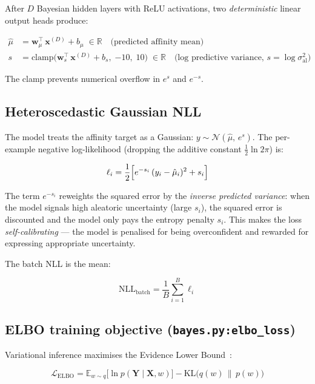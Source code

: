 \documentclass[11pt,a4paper]{article}
\newcommand{\R}{\mathbb{R}}
\newcommand{\code}[1]{\texttt{#1}}
\begin{document}
After $D$ Bayesian hidden layers with ReLU activations, two \emph{deterministic}
linear output heads produce:

\begin{align}
\hat{\mu} &= \mathbf{w}_\mu^\top\,\mathbf{x}^{(D)} + b_\mu \;\in \R
  \quad\text{(predicted affinity mean)}\\
s &= \mathrm{clamp}\!\bigl(
      \mathbf{w}_s^\top\,\mathbf{x}^{(D)} + b_s,\;
      {-10},\; 10
    \bigr) \;\in \R
  \quad\text{(log predictive variance, } s = \log\sigma_{\mathrm{al}}^2\text{)}
\end{align}

The clamp prevents numerical overflow in $e^{s}$ and $e^{-s}$.

\subsection{Heteroscedastic Gaussian NLL}

The model treats the affinity target as a Gaussian:
$y \sim \mathcal{N}(\hat{\mu},\, e^s)$.  The per-example negative
log-likelihood (dropping the additive constant $\tfrac{1}{2}\ln 2\pi$) is:

\begin{equation}
\ell_i = \frac{1}{2}\Bigl[e^{-s_i}\,(y_i - \hat{\mu}_i)^2 + s_i\Bigr]
\label{eq:hetero_nll}
\end{equation}

The term $e^{-s_i}$ reweights the squared error by the \emph{inverse predicted
variance}: when the model signals high aleatoric uncertainty (large $s_i$), the
squared error is discounted and the model only pays the entropy penalty $s_i$.
This makes the loss \emph{self-calibrating} — the model is penalised for being
overconfident and rewarded for expressing appropriate uncertainty.

The batch NLL is the mean:

\begin{equation}
\mathrm{NLL}_{\mathrm{batch}}
= \frac{1}{B} \sum_{i=1}^{B} \ell_i
\end{equation}

\subsection{ELBO training objective (\code{bayes.py:elbo\_loss})}

Variational inference maximises the Evidence Lower Bound~\cite{blundell2015}:

\begin{equation}
\mathcal{L}_{\mathrm{ELBO}}
= \mathbb{E}_{w \sim q}\!\bigl[\ln p(\mathbf{Y} \mid \mathbf{X}, w)\bigr]
  - \mathrm{KL}\!\bigl(q(w) \,\|\, p(w)\bigr)
\end{equation}
\end{document}
